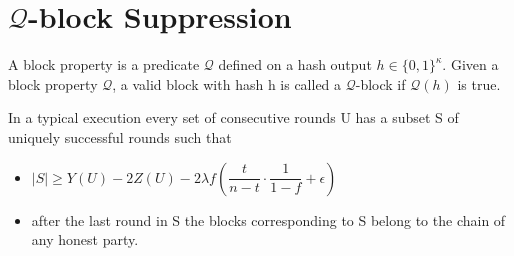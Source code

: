 \section{$\mathcal{Q}$-block Suppression}
\begin{definition}
    \cite{dionyziz}
    A block property is a predicate $\mathcal{Q}$ defined on a hash output $h \in \{ 0, 1 \}^\kappa$. Given  a block property $\mathcal{Q}$, a valid block with hash h is called a $\mathcal{Q}$-block if $\mathcal{Q}(h)$ is true.
\end{definition}

\begin{lemma}[Unsuppressibility]\cite{dionyziz}
    In a typical execution every set of consecutive rounds U has a subset S of uniquely successful rounds such that
    \begin{itemize}
        \item $\vert S \vert \geq Y(U) - 2Z(U) - 2 \lambda f (\dfrac{t}{n-t} \cdot \dfrac{1}{1-f} + \epsilon)$
        \item after the last round in S the blocks corresponding to S belong to the chain of any honest party.
    \end{itemize}
\end{lemma}

